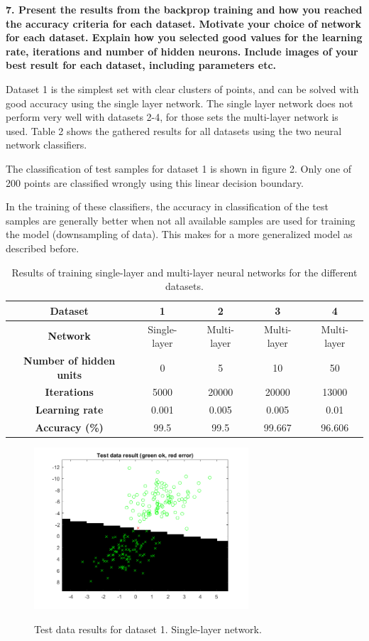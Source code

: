 \documentclass[twocolumn]{report}
\begin{document}
	\textbf{7. Present the results from the backprop training and how you reached the accuracy criteria for each dataset. Motivate your choice of network for each dataset. Explain how you selected good values for the learning rate, iterations and number of hidden neurons. Include images of your best result for each dataset, including parameters etc.}
	
	Dataset 1 is the simplest set with clear clusters of points, and can be solved with good accuracy using the single layer network. The single layer network does not perform very well with datasets 2-4, for those sets the multi-layer network is used. Table 2 shows the gathered results for all datasets using the two neural network classifiers. 
	
	The classification of test samples for dataset 1 is shown in figure 2. Only one of 200 points are classified wrongly using this linear decision boundary. 
	
	In the training of these classifiers, the accuracy in classification of the test samples are generally better when not all available samples are used for training the model (downsampling of data). This makes for a more generalized model as described before. \\
	
	\begin{table}[t]
		\caption{Results of training single-layer and multi-layer neural networks for the different datasets.} 
		\label{tab:title} 
		\centering
		\begin{tabular}{|c|c|c|c|c|}
			\hline
			\textbf{Dataset} & 1 & 2 & 3 & 4\\
			\hline
			\textbf{Network} & Single-layer & Multi-layer & Multi-layer & Multi-layer\\
			\hline
			\textbf{Number of hidden units} & 0 & 5 & 10 & 50\\
			\hline
			\textbf{Iterations} & 5000 & 20000 & 20000 & 13000\\
			\hline
			\textbf{Learning rate} & 0.001 & 0.005 & 0.005 & 0.01\\
			\hline
			\textbf{Accuracy (\%)} & 99.5 & 99.5 & 99.667 & 96.606\\
			\hline
		\end{tabular} 
	\end{table}
	
	\begin{figure}[h]
		\includegraphics[width=8cm]{../single_set1.png}
		\label{img:testset1}
		\caption{Test data results for dataset 1. Single-layer network.}
	\end{figure}
	
\end{document}
